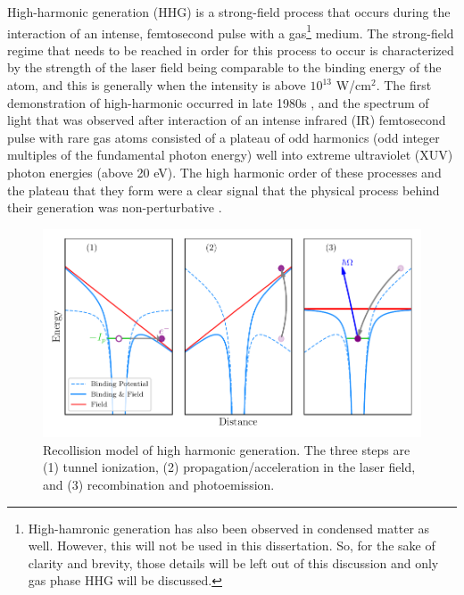 High-harmonic generation (HHG) is a strong-field process that occurs during the interaction of an intense, femtosecond pulse with a gas\footnote{High-hamronic generation has also been observed in condensed matter as well. However, this will not be used in this dissertation.  So, for the sake of clarity and brevity, those details will be left out of this discussion and only gas phase HHG will be discussed.} medium.  The strong-field regime that needs to be reached in order for this process to occur is characterized by the strength of the laser field being comparable to the binding energy of the atom, and this is generally when the intensity is above $10^{13}$ W/cm$^{2}$.  The first demonstration of high-harmonic occurred in late 1980s \cite{mcphersonStudiesMultiphotonProduction1987, liMultipleharmonicGenerationRare1989}, and the spectrum of light that was observed after interaction of an intense infrared (IR) femtosecond pulse with rare gas atoms consisted of a plateau of odd harmonics (odd integer multiples of the fundamental photon energy) well into extreme ultraviolet (XUV) photon energies (above 20 eV).  The high harmonic order of these processes and the plateau that they form were a clear signal that the physical process behind their generation was non-perturbative \cite{boydNonlinearOptics2008}.  

\begin{figure}
	\centering
	\includegraphics[width=1.0\textwidth]{figures/Introduction/3-step.pdf}
	\caption[Recollision model of high harmonic generation]{Recollision model of high harmonic generation.  The three steps are (1) tunnel ionization, (2) propagation/acceleration in the laser field, and (3) recombination and photoemission.}
	\label{fig:3-step}
\end{figure}

